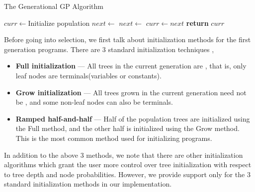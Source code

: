 \begin{algorithm}
  \caption{The Generational GP Algorithm}\label{gpalgo}
  \begin{algorithmic}[1]
  \State $curr \gets $Initialize population  
  \State {} 
  \Repeat
  \State $next \gets $ 
  \State $next \gets $  
  \State {}
  \State $curr \gets next$
  \label{gpalgoendloop}
  \State \textbf{return} $curr$
  \EndProcedure
  \end{algorithmic}
\end{algorithm}

Before going into selection, we first talk about initialization methods for the first generation programs. There are $3$ standard initialization techniques \citep{Koza92},
\begin{itemize}
    \item \textbf{Full initialization} --- All trees in the current generation are , that is, only leaf nodes are terminals(variables or constants).
    \item \textbf{Grow initialization} --- All trees grown in the current generation need not be , and some non-leaf nodes can also be terminals. 
    \item \textbf{Ramped half-and-half} --- Half of the population trees are initialized using the Full method, and the other half is initialized using the Grow method. This is the most common method used for initializing programs.
\end{itemize}

In addition to the above $3$ methods, we note that there are other initialization algorithms which grant the user more control over tree initialization with respect to tree depth and node probabilities\citep{luke:2000:2ftcaGP}.
However, we provide support only for the $3$ standard initialization methods in our implementation.

